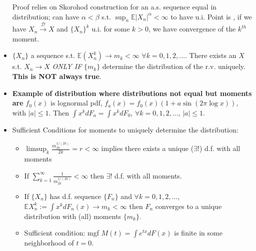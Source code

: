 \documentclass[11pt]{article}
\newcommand{\ga}{\alpha}
\newcommand{\gb}{\beta}
\newcommand\abs[1]{\left|#1\right|}
\renewcommand{\to}{\longrightarrow}
\newcommand{\dto}{\overset{\mathcal{D}}{\to}}
\newcommand{\E}{\mathbb{E}}
\newcommand{\seq}[1]{\{#1\}}
\begin{document}
\begin{multicols}{2}
\begin{itemize}
Proof relies on Skorohod construction for an a.s. sequence equal in distribution; can have $\ga<\gb$ s.t. $\sup_n \E \abs{X_n}^\ga< \infty$ to have u.i.  Point is , if we have $X_n \dto X$ and $\seq{X_n}^k$ u.i. for some $k>0$, we have convergence of the $k^{th}$ moment.
\item $\seq{X_n}$ a sequence s.t. $\E(X_n^k) \to m_k<\infty$ $\forall k = 0,1,2,\ldots$.  There exists an $X$ s.t. $X_n \to X$ \textit{ONLY IF} $\seq{m_k}$ determine the distribution of the r.v. uniquely.  \textbf{This is NOT always true}. 
\item \textbf{Example of distribution where distributions not equal but moments are} $f_0(x)$ is lognormal pdf, $f_a(x)= f_0(x)(1+a\sin(2\pi \log x))$, with $\abs{a}\leq 1$.  Then $\int x^k dF_a = \int x^k dF_0$, $\forall k=0,1,2,\ldots $, $\abs{a} \leq 1$.
\item Sufficient Conditions for moments to uniquely determine the distribution:
\begin{itemize}
\item $\limsup _k \frac{m_{2k}^{1/(2k)}}{2k}=r<\infty $ implies there exists a unique ($\exists ! $) d.f. with all moments
\item If $\sum_{k=1}^\infty \frac{1}{m_{2k}^{1/(2k)}}< \infty$ then $\exists ! $ d.f. with all moments.
\item If $\seq{X_n}$ has d.f. sequence $\seq{F_n}$ and $\forall k=0,1,2,\ldots$, $\E X_n^k :=\int x^k dF_n(x) \to m_k < \infty$ then $F_n$ converges to a unique distribution with (all) moments $\seq{m_k}$.
\item Sufficient condition: mgf $M(t)= \int e^{tx}dF(x)$ is finite in some neighborhood of $t=0$.
\end{itemize}
\end{itemize}

\end{multicols}
\end{document}
